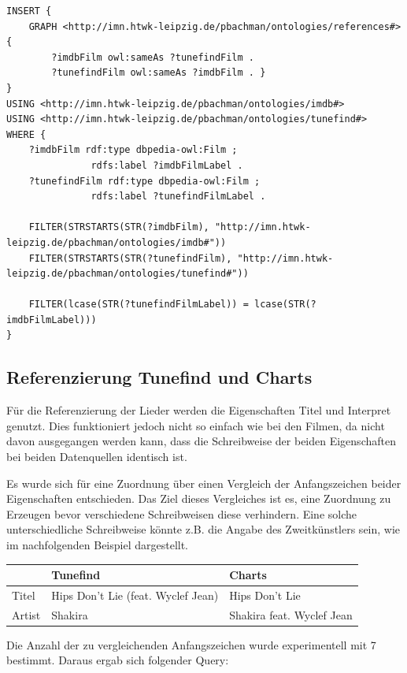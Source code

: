 \documentclass[parskip]{scrartcl}
\begin{document}
\begin{lstlisting}[caption={Offizielle Charts JSON-Format}, label={list:chartsDeJson},float,floatplacement=H]
INSERT {
    GRAPH <http://imn.htwk-leipzig.de/pbachman/ontologies/references#> { 
        ?imdbFilm owl:sameAs ?tunefindFilm .
        ?tunefindFilm owl:sameAs ?imdbFilm . }
}
USING <http://imn.htwk-leipzig.de/pbachman/ontologies/imdb#>
USING <http://imn.htwk-leipzig.de/pbachman/ontologies/tunefind#>
WHERE {
    ?imdbFilm rdf:type dbpedia-owl:Film ;
               rdfs:label ?imdbFilmLabel .
    ?tunefindFilm rdf:type dbpedia-owl:Film ;
               rdfs:label ?tunefindFilmLabel .
    
    FILTER(STRSTARTS(STR(?imdbFilm), "http://imn.htwk-leipzig.de/pbachman/ontologies/imdb#"))
    FILTER(STRSTARTS(STR(?tunefindFilm), "http://imn.htwk-leipzig.de/pbachman/ontologies/tunefind#"))
    
    FILTER(lcase(STR(?tunefindFilmLabel)) = lcase(STR(?imdbFilmLabel)))
}
\end{lstlisting}

\subsection{Referenzierung Tunefind und Charts}
Für die Referenzierung der Lieder werden die Eigenschaften Titel und Interpret genutzt. Dies funktioniert jedoch nicht so einfach wie bei den Filmen, da nicht davon ausgegangen werden kann, dass die Schreibweise der beiden Eigenschaften bei beiden Datenquellen identisch ist.

Es wurde sich für eine Zuordnung über einen Vergleich der Anfangszeichen beider Eigenschaften entschieden. Das Ziel dieses Vergleiches ist es, eine Zuordnung zu Erzeugen bevor verschiedene Schreibweisen diese verhindern. Eine solche unterschiedliche Schreibweise könnte z.B. die Angabe des Zweitkünstlers sein, wie im nachfolgenden Beispiel dargestellt.
\begin{center}
    \begin{tabular}{l|l|l}
         & \textbf{Tunefind} & \textbf{Charts} \\\hline
        Titel & Hips Don't Lie (feat. Wyclef Jean)  & Hips Don't Lie\\
        Artist & Shakira & Shakira feat. Wyclef Jean\\
    \end{tabular}
\end{center}

Die Anzahl der zu vergleichenden Anfangszeichen wurde experimentell mit 7 bestimmt. Daraus ergab sich folgender Query:
\end{document}

